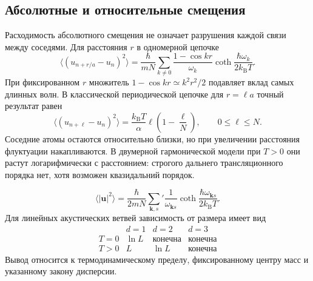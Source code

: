 \documentclass[../final.tex]{subfiles}
\begin{document}
\subsection*{Абсолютные и относительные смещения}

Расходимость абсолютного смещения не означает разрушения каждой
связи между соседями. Для расстояния $r$ в одномерной цепочке
\[
    \langle(u_{n+r/a}-u_n)^2\rangle
       =\frac{\hbar}{mN}\sum_{k\ne0}
          \frac{1-\cos kr}{\omega_k}
          \coth\frac{\hbar\omega_k}{2k_{\mathrm B}T}.
\]
При фиксированном $r$ множитель $1-\cos kr\simeq k^2r^2/2$
подавляет вклад самых длинных волн. В классической периодической
цепочке для $r=\ell a$ точный результат равен
\[
    \langle(u_{n+\ell}-u_n)^2\rangle
       =\frac{k_{\mathrm B}T}{\alpha}\ell
          \left(1-\frac\ell N\right),\qquad 0\le\ell\le N.
\]
Соседние атомы остаются относительно близки, но при увеличении
расстояния флуктуации накапливаются.
В двумерной гармонической модели при $T>0$ они растут
логарифмически с расстоянием: строгого дальнего трансляционного
порядка нет, хотя возможен квазидальний порядок.

\answer
\[
    \langle|\boldsymbol u|^2\rangle
       =\frac{\hbar}{2mN}\sum_{\boldsymbol k,s}'
          \frac1{\omega_{\boldsymbol k s}}
          \coth\frac{\hbar\omega_{\boldsymbol k s}}{2k_{\mathrm B}T}.
\]
Для линейных акустических ветвей зависимость от размера имеет вид
\[
\begin{array}{c|ccc}
    &d=1&d=2&d=3\\ \hline
    T=0&\ln L&\text{конечна}&\text{конечна}\\
    T>0&L&\ln L&\text{конечна}
\end{array}
\]
Вывод относится к термодинамическому пределу, фиксированному центру
масс и указанному закону дисперсии.

\endgroup
\end{document}
